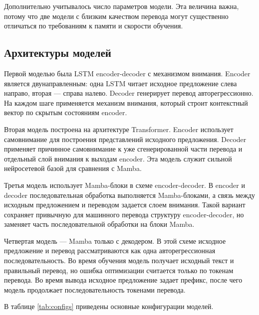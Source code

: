Дополнительно учитывалось число параметров модели.
Эта величина важна, потому что две модели с близким качеством перевода могут существенно отличаться по требованиям к памяти и скорости обучения.

\subsection{Архитектуры моделей}

Первой моделью была LSTM encoder-decoder с механизмом внимания.
Encoder является двунаправленным: одна LSTM читает исходное предложение слева направо, вторая --- справа налево.
Decoder генерирует перевод авторегрессионно.
На каждом шаге применяется механизм внимания, который строит контекстный вектор по скрытым состояниям encoder.

Вторая модель построена на архитектуре Transformer.
Encoder использует самовнимание для построения представлений исходного предложения.
Decoder применяет причинное самовнимание к уже сгенерированной части перевода и отдельный слой внимания к выходам encoder.
Эта модель служит сильной нейросетевой базой для сравнения с Mamba.

Третья модель использует Mamba-блоки в схеме encoder-decoder.
В encoder и decoder последовательная обработка выполняется Mamba-блоками, а связь между исходным предложением и переводом задается слоем внимания.
Такой вариант сохраняет привычную для машинного перевода структуру encoder-decoder, но заменяет часть последовательной обработки на блоки Mamba.

Четвертая модель --- Mamba только с декодером.
В этой схеме исходное предложение и перевод рассматриваются как одна авторегрессионная последовательность.
Во время обучения модель получает исходный текст и правильный перевод, но ошибка оптимизации считается только по токенам перевода.
Во время вывода исходное предложение задает префикс, после чего модель продолжает последовательность токенами перевода.

В таблице \ref{tab:configs} приведены основные конфигурации моделей.

\begin{table}[H]
    \centering
    \caption{Основные конфигурации моделей}
    \label{tab:configs}
\end{table}

